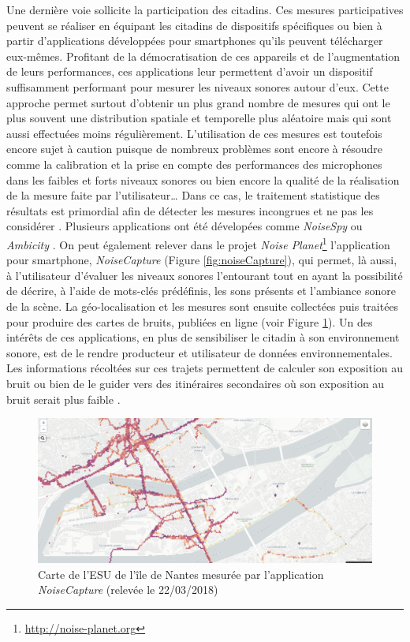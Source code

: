 Une dernière voie sollicite la participation des citadins. Ces mesures participatives peuvent se réaliser en équipant les citadins de dispositifs spécifiques \cite{delaitre2014influence} ou bien à partir d'applications développées pour smartphones qu'ils peuvent télécharger eux-mêmes. Profitant de la démocratisation de ces appareils et de l'augmentation de leurs performances, ces applications leur permettent d'avoir un dispositif suffisamment performant pour mesurer les niveaux sonores autour d'eux. Cette approche permet surtout d'obtenir un plus grand nombre de mesures qui ont le plus souvent une distribution spatiale et temporelle plus aléatoire mais qui sont aussi effectuées moins régulièrement. L'utilisation de ces mesures est toutefois encore sujet à caution puisque de nombreux problèmes sont encore à résoudre comme la calibration et la prise en compte des performances des microphones dans les faibles et forts niveaux sonores \cite{aumond2017study} ou bien encore la qualité de la réalisation de la mesure faite par l'utilisateur\dots{} Dans ce cas, le traitement statistique des résultats est primordial afin de détecter les mesures incongrues et ne pas les considérer \cite{guillaume2016noise}. Plusieurs applications ont été dévelopées comme \textit{NoiseSpy} \cite{kanjo_noisespy_2010} ou \textit{Ambicity} \cite{ventura2017estimation}. On peut également relever dans le projet \textit{Noise Planet}\footnote{\url{http://noise-planet.org}} l'application pour smartphone, \textit{NoiseCapture} \cite{guillaume2016noise} (Figure \ref{fig:noiseCapture}), qui permet, là aussi, à l'utilisateur d'évaluer les niveaux sonores l'entourant tout en ayant la possibilité de décrire, à l'aide de mots-clés prédéfinis, les sons présents et l'ambiance sonore de la scène. La géo-localisation et les mesures sont ensuite collectées puis traitées pour produire des cartes de bruits, publiées en ligne (voir Figure \ref{fig:carte_noiseModelling}). Un des intérêts de ces applications, en plus de sensibiliser le citadin à son environnement sonore, est de le rendre producteur et utilisateur de données environnementales. Les informations récoltées sur ces trajets permettent de calculer son exposition au bruit ou bien de le guider vers des itinéraires secondaires où son exposition au bruit serait plus faible \cite{aumond2016sound}.\\


\begin{figure}[t]
\centering
\includegraphics[width=0.7\linewidth]{./figures/cartographie/noise_modelling.PNG}
\caption{Carte de l'ESU de l'île de Nantes mesurée par l'application \textit{NoiseCapture}  (relevée le 22/03/2018)}
\label{fig:carte_noiseModelling}
\end{figure}

